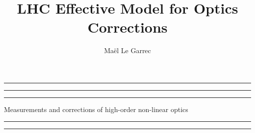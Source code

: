 \begin{titlepage}
    \makeatletter
    \def\subtitle#1{\def\@subtitle{#1}}
    \def\maketitle{%
        \thispagestyle{empty} %
        \noindent\rule[0.5em]{\textwidth}{1.5pt}\vspace{-22pt}
        \noindent\rule[0.5em]{\textwidth}{1.5pt}\vspace{-22pt}
        \noindent\rule[0.5em]{\textwidth}{1.5pt}
        \vspace{0.5cm}
        \chapterfont\fontsize{33pt}{30pt}\selectfont%
        \begin{flushright}%
            \bfseries
            \MakeUppercase{
                \@title
            }%
        \end{flushright}
        \vspace{.1em}
        \subtitlefont\fontsize{11pt}{15pt}\selectfont%
        \begin{flushright}%
            Measurements and corrections of high-order non-linear optics
        \end{flushright}
        \vfill
        \chapterfont\fontsize{15pt}{0pt}\selectfont%
        \bfseries\noindent\scshape\@author
        \par
        \vspace{0.7em}
        \noindent\rule[0.5em]{\textwidth}{1.5pt}\vspace{-20pt}
        \noindent\rule[0.5em]{\textwidth}{1.5pt}
    }
    \makeatother
    
    \title{LHC Effective Model for Optics Corrections}
    \subtitle{Measurements and corrections of high-order non-linear optics}
    \author{Maël Le Garrec}
    
    \clearpage\maketitle
    \restoregeometry
\end{titlepage}